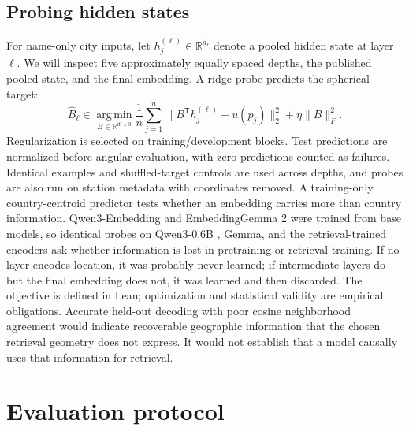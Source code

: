 \documentclass[10pt]{article}
\begin{document}
\subsection{Probing hidden states}
For name-only city inputs, let $h_j^{(\ell)}\in\mathbb R^{d_\ell}$ denote a pooled hidden state at layer $\ell$. We will inspect five approximately equally spaced depths, the published pooled state, and the final embedding. A ridge probe predicts the spherical target:
\begin{equation}
\widehat B_\ell\in\operatorname*{arg\,min}_{B\in\mathbb R^{d_\ell\times3}}
\frac1n\sum_{j=1}^{n}\lVert B^{\mathsf T}h_j^{(\ell)}-u(p_j)\rVert_2^2
  +\eta\lVert B\rVert_F^2.
\label{eq:probe}
\end{equation}
Regularization is selected on training/development blocks. Test predictions are normalized before angular evaluation, with zero predictions counted as failures. Identical examples and shuffled-target controls are used across depths, and probes are also run on station metadata with coordinates removed. A training-only country-centroid predictor tests whether an embedding carries more than country information. Qwen3-Embedding and EmbeddingGemma 2 were trained from base models, so identical probes on Qwen3-0.6B \citep{qwen3technicalreport}, Gemma, and the retrieval-trained encoders ask whether information is lost in pretraining or retrieval training. If no layer encodes location, it was probably never learned; if intermediate layers do but the final embedding does not, it was learned and then discarded. The objective is defined in Lean; optimization and statistical validity are empirical obligations. Accurate held-out decoding with poor cosine neighborhood agreement would indicate recoverable geographic information that the chosen retrieval geometry does not express. It would not establish that a model causally uses that information for retrieval.

\section{Evaluation protocol}
\label{sec:evaluation}
\end{document}
